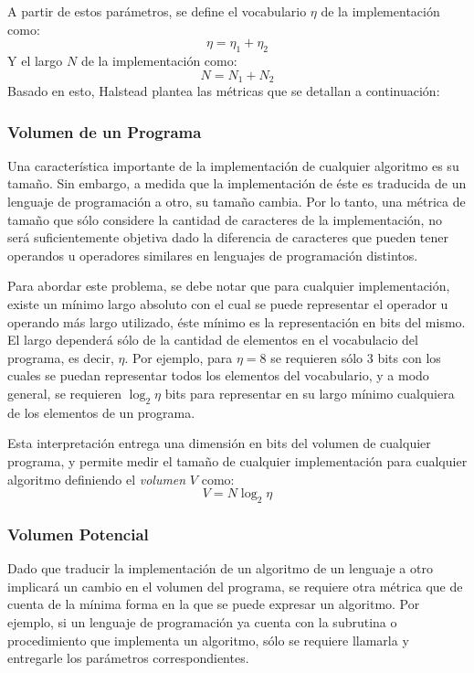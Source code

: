 \documentclass[letterpaper,12pt]{article}
\begin{document}
A partir de estos parámetros, se define el vocabulario $\eta$ de la implementación como:
\begin{equation*}
  \eta = \eta_{1} + \eta_{2}
\end{equation*}
Y el largo $N$ de la implementación como:
\begin{equation*}
  N = N_{1} + N_{2}
\end{equation*}
Basado en esto, Halstead plantea las métricas que se detallan a continuación:

\subsubsection{Volumen de un Programa}

Una característica importante de la implementación de cualquier algoritmo es su tamaño. Sin embargo, a medida que la implementación de éste es traducida de un lenguaje de programación a otro, su tamaño cambia. Por lo tanto, una métrica de tamaño que sólo considere la cantidad de caracteres de la implementación, no será suficientemente objetiva dado la diferencia de caracteres que pueden tener operandos u operadores similares en lenguajes de programación distintos.

Para abordar este problema, se debe notar que para cualquier implementación, existe un mínimo largo absoluto con el cual se puede representar el operador u operando más largo utilizado, éste mínimo es la representación en bits del mismo. El largo dependerá sólo de la cantidad de elementos en el vocabulacio del programa, es decir, $\eta$. Por ejemplo, para $\eta = 8$ se requieren sólo 3 bits con los cuales se puedan representar todos los elementos del vocabulario, y a modo general, se requieren $\log_{2}\eta$ bits para representar en su largo mínimo cualquiera de los elementos de un programa.

Esta interpretación entrega una dimensión en bits del volumen de cualquier programa, y permite medir el tamaño de cualquier implementación para cualquier algoritmo definiendo el \textit{volumen} $V$ como:
\begin{equation}
  V = N\log_{2}\eta
\end{equation}
\subsubsection{Volumen Potencial}

Dado que traducir la implementación de un algoritmo de un lenguaje a otro implicará un cambio en el volumen del programa, se requiere otra métrica que de cuenta de la mínima forma en la que se puede expresar un algoritmo. Por ejemplo, si un lenguaje de programación ya cuenta con la subrutina o procedimiento que implementa un algoritmo, sólo se requiere llamarla y entregarle los parámetros correspondientes.
\end{document}
